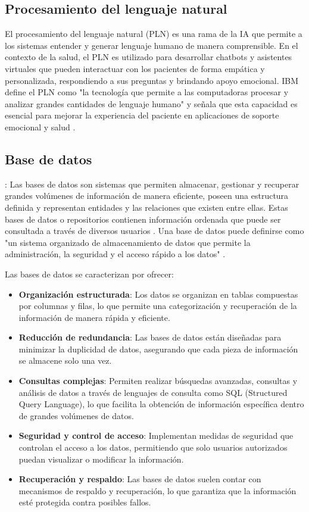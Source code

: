 \subsection{Procesamiento del lenguaje natural}

El procesamiento del lenguaje natural (PLN) es una rama de la IA que permite a los sistemas entender y generar lenguaje humano de manera comprensible. En el contexto de la salud, el PLN es utilizado para desarrollar chatbots y asistentes virtuales que pueden interactuar con los pacientes de forma empática y personalizada, respondiendo a sus preguntas y brindando apoyo emocional. IBM define el PLN como "la tecnología que permite a las computadoras procesar y analizar grandes cantidades de lenguaje humano" y señala que esta capacidad es esencial para mejorar la experiencia del paciente en aplicaciones de soporte emocional y salud \parencite{ibm2023} .

\subsection{Base de datos}:
Las bases de datos son sistemas que permiten almacenar, gestionar y recuperar grandes volúmenes de información de manera eficiente, poseen una estructura definida y representan entidades y las relaciones que existen entre ellas. Estas bases de datos o repositorios contienen información ordenada que puede ser consultada a través de diversos usuarios \parencite{perez2007}. Una base de datos puede definirse como "un sistema organizado de almacenamiento de datos que permite la administración, la seguridad y el acceso rápido a los datos" \parencite{nutanix2023}.

Las bases de datos se caracterizan por ofrecer:
\begin{itemize}
    \item \textbf{Organización estructurada}: Los datos se organizan en tablas compuestas por columnas y filas, lo que permite una categorización y recuperación de la información de manera rápida y eficiente.
    \item \textbf{Reducción de redundancia}: Las bases de datos están diseñadas para minimizar la duplicidad de datos, asegurando que cada pieza de información se almacene solo una vez.
    \item \textbf{Consultas complejas}: Permiten realizar búsquedas avanzadas, consultas y análisis de datos a través de lenguajes de consulta como SQL (Structured Query Language), lo que facilita la obtención de información específica dentro de grandes volúmenes de datos.
    \item \textbf{Seguridad y control de acceso}: Implementan medidas de seguridad que controlan el acceso a los datos, permitiendo que solo usuarios autorizados puedan visualizar o modificar la información.
    \item \textbf{Recuperación y respaldo}: Las bases de datos suelen contar con mecanismos de respaldo y recuperación, lo que garantiza que la información esté protegida contra posibles fallos.
\end{itemize}

